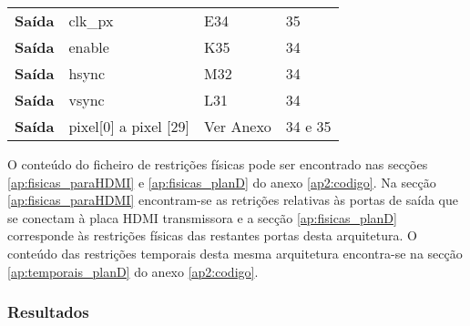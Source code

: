 \begin{table}[h!]
\begin{tabular}{rlll}
			\multicolumn{1}{r|}{\textbf{Saída}}   & clk\_px                            & E34                                      & 35                                         \\
			\multicolumn{1}{r|}{\textbf{Saída}}   & enable                             & K35                                      & 34                                         \\
			\multicolumn{1}{r|}{\textbf{Saída}}   & hsync                              & M32                                      & 34                                         \\
			\multicolumn{1}{r|}{\textbf{Saída}}   & vsync                              & L31                                      & 34                                         \\
			\multicolumn{1}{r|}{\textbf{Saída}}   & pixel{[}0{]} a pixel {[}29{]}      & Ver Anexo                                & 34 e 35                                    \\ \hline
		\end{tabular}%
\end{table}



O conteúdo do ficheiro de restrições físicas pode ser encontrado nas secções \ref{ap:fisicas_paraHDMI} e \ref{ap:fisicas_planD} do anexo \ref{ap2:codigo}. Na secção \ref{ap:fisicas_paraHDMI}  encontram-se as retrições relativas às portas de saída que se conectam à placa HDMI transmissora e a secção \ref{ap:fisicas_planD} corresponde às restrições físicas das restantes portas desta arquitetura. O conteúdo das restrições temporais desta mesma arquitetura encontra-se na secção \ref{ap:temporais_planD} do anexo \ref{ap2:codigo}.
%
%
\subsubsection{Resultados} \label{subsub:serial_planDresults}

